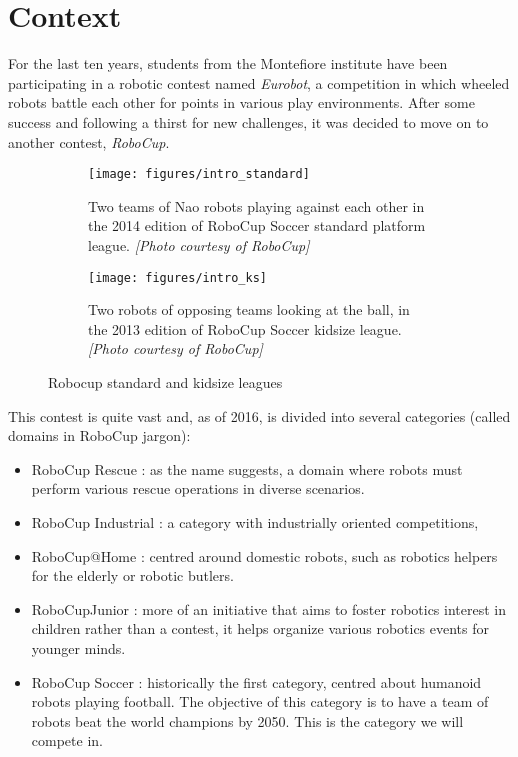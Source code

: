 \section{Context}
For the last ten years, students from the Montefiore institute have been participating in a robotic contest named \emph{Eurobot}, a competition in which wheeled robots battle each other for points in various play environments. After some success and following a thirst for new challenges, it was decided to move on to another contest, \emph{RoboCup}.

\begin{figure}[htp]
\center
\begin{subfigure}[b]{0.45\textwidth}
\texttt{[image: figures/intro\_standard]}
\caption[Robocup Soccer standard platform]{Two teams of Nao robots playing against each other in the 2014 edition of RoboCup Soccer standard platform league. \textit{[Photo courtesy of RoboCup]}}
\label{fig:intro_standard}
\end{subfigure}
\hfill
\begin{subfigure}[b]{0.45\textwidth}
\texttt{[image: figures/intro\_ks]}
\caption[Robocup Soccer standard platform]{Two robots of opposing teams looking at the ball, in the 2013 edition of RoboCup Soccer kidsize league. \textit{[Photo courtesy of RoboCup]}}
\label{fig:intro_ks}
\end{subfigure}
\caption[Robocup standard and kidsize leagues]{Robocup standard and kidsize leagues}
\label{fig:intro_robocup}
\end{figure}

This contest is quite vast and, as of 2016, is divided into several categories (called domains in RoboCup jargon):
\begin{itemize}
\item RoboCup Rescue : as the name suggests, a domain where robots must perform various rescue operations in diverse scenarios.
\item RoboCup Industrial : a category with industrially oriented competitions, 
\item RoboCup@Home : centred around domestic robots, such as robotics helpers for the elderly or robotic butlers.
\item RoboCupJunior : more of an initiative that aims to foster robotics interest in children rather than a contest, it helps organize various robotics events for younger minds.
\item RoboCup Soccer : historically the first category, centred about humanoid robots playing football. The objective of this category is to have a team of robots beat the world champions by 2050. This is the category we will compete in.
\end{itemize}


